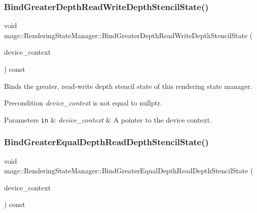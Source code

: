 \subsubsection{\texorpdfstring{Bind\+Greater\+Depth\+Read\+Write\+Depth\+Stencil\+State()}{BindGreaterDepthReadWriteDepthStencilState()}}
{\footnotesize\ttfamily void mage\+::\+Rendering\+State\+Manager\+::\+Bind\+Greater\+Depth\+Read\+Write\+Depth\+Stencil\+State (\begin{DoxyParamCaption}\item[{I\+D3\+D11\+Device\+Context2 $\ast$}]{device\+\_\+context }\end{DoxyParamCaption}) const\hspace{0.3cm}{\ttfamily [noexcept]}}

Binds the greater, read-\/write depth stencil state of this rendering state manager.

\begin{DoxyPrecond}{Precondition}
{\itshape device\+\_\+context} is not equal to {\ttfamily nullptr}. 
\end{DoxyPrecond}

\begin{DoxyParams}[1]{Parameters}
\mbox{\tt in}  & {\em device\+\_\+context} & A pointer to the device context. \\
\hline
\end{DoxyParams}
\hypertarget{classmage_1_1_rendering_state_manager_a1e9b1b60e81df634a514f3c9c283da54}{}\label{classmage_1_1_rendering_state_manager_a1e9b1b60e81df634a514f3c9c283da54} 
\subsubsection{\texorpdfstring{Bind\+Greater\+Equal\+Depth\+Read\+Depth\+Stencil\+State()}{BindGreaterEqualDepthReadDepthStencilState()}}
{\footnotesize\ttfamily void mage\+::\+Rendering\+State\+Manager\+::\+Bind\+Greater\+Equal\+Depth\+Read\+Depth\+Stencil\+State (\begin{DoxyParamCaption}\item[{I\+D3\+D11\+Device\+Context2 $\ast$}]{device\+\_\+context }\end{DoxyParamCaption}) const\hspace{0.3cm}{\ttfamily [noexcept]}}

